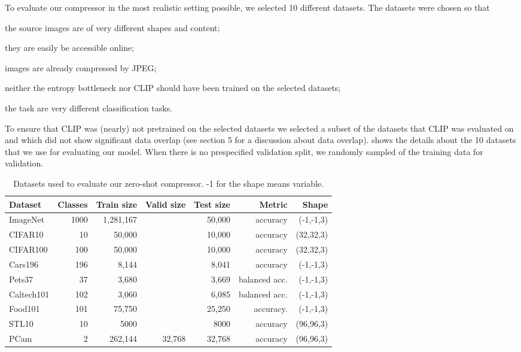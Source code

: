 \documentclass[final]{article}
\begin{document}
To evaluate our compressor in the most realistic setting possible, we selected 10 different datasets.
The datasets were chosen so that
\begin{inlinelist}
\item the source images are of very different shapes and content;
\item they are easily be accessible online;
\item images are already compressed by JPEG;
\item neither the entropy bottleneck nor CLIP should have been trained on the selected datasets;
\item the task are very different classification tasks.
\end{inlinelist}
To ensure that CLIP was (nearly) not pretrained on the selected datasets we selected a subset of the datasets that CLIP was evaluated on and which did not show significant data overlap (see  section 5 for a discussion about data overlap).
 shows the details about the 10 datasets that we use for evaluating our model.
When there is no prespecified validation split, we randomly sampled  of the training data for validation.

\begin{table}[h]
\caption{
Datasets used to evaluate our zero-shot compressor. -1 for the shape means variable. 
}
\begin{center}
\begin{tabular}{lrrrrrr}
\toprule
Dataset & Classes  & Train size & Valid size & Test size & Metric & Shape   \\ 
\midrule 
ImageNet \cite{deng_imagenet_2009} & 1000 &  1,281,167 &    & 50,000 & accuracy & (-1,-1,3) \\
CIFAR10 \cite{krizhevsky_learning_2009} & 10 & 50,000 & & 10,000 & accuracy & (32,32,3) \\
CIFAR100 \cite{krizhevsky_learning_2009} & 100 & 50,000 & & 10,000 & accuracy & (32,32,3) \\
Cars196 \cite{krause_3d_2013} & 196 & 8,144 &  & 8,041 & accuracy & (-1,-1,3) \\
Pets37 \cite{parkhi_cats_2012} & 37 & 3,680 &  &  3,669 & balanced acc. & (-1,-1,3) \\
Caltech101 \cite{li_learning_2007} & 102 & 3,060 & & 6,085 & balanced acc. & (-1,-1,3) \\
Food101 \cite{nilsback_automated_2008} & 101 & 75,750 &   & 25,250 & accuracy. & (-1,-1,3) \\
STL10 \cite{coates_analysis_2011} & 10 &  5000 & &  8000 & accuracy & (96,96,3) \\
PCam \cite{veeling_rotation_2018,ehteshami_bejnordi_diagnostic_2017} & 2 &  262,144 & 32,768 & 32,768 & accuracy & (96,96,3)  \\
\bottomrule
\end{tabular}
\end{center}
\label{table:clip_data}
\end{table}
 
\end{document}

